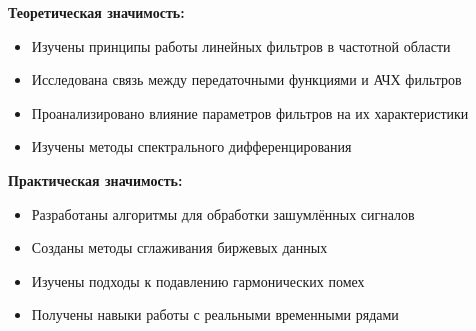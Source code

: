 \textbf{Теоретическая значимость:}
\begin{itemize}
    \item Изучены принципы работы линейных фильтров в частотной области
    \item Исследована связь между передаточными функциями и АЧХ фильтров
    \item Проанализировано влияние параметров фильтров на их характеристики
    \item Изучены методы спектрального дифференцирования
\end{itemize}

\textbf{Практическая значимость:}
\begin{itemize}
    \item Разработаны алгоритмы для обработки зашумлённых сигналов
    \item Созданы методы сглаживания биржевых данных
    \item Изучены подходы к подавлению гармонических помех
    \item Получены навыки работы с реальными временными рядами
\end{itemize}
